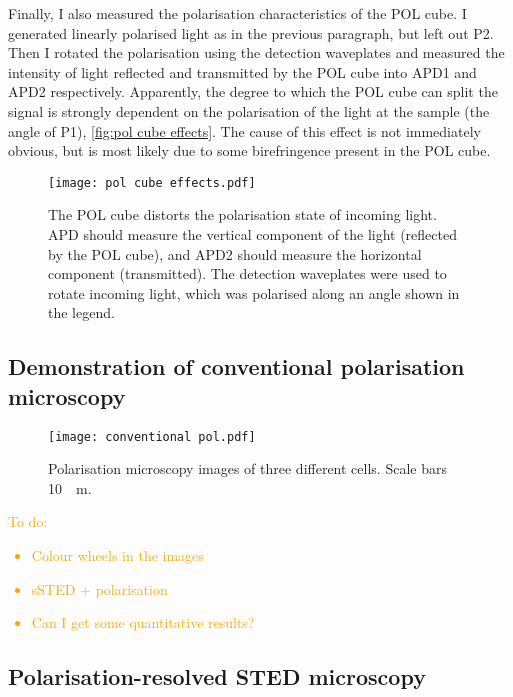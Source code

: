 Finally, I also measured the polarisation characteristics of the POL cube. I generated linearly polarised light as in the previous paragraph, but left out P2. Then I rotated the polarisation using the detection waveplates and measured the intensity of light reflected and transmitted by the POL cube into APD1 and APD2 respectively. Apparently, the degree to which the POL cube can split the signal is strongly dependent on the polarisation of the light at the sample (the angle of P1), \autoref{fig:pol cube effects}. The cause of this effect is not immediately obvious, but is most likely due to some birefringence present in the POL cube. 

\begin{figure}
	\centering
	\texttt{[image: pol cube effects.pdf]}
	\caption{The POL cube distorts the polarisation state of incoming light. APD should measure the vertical component of the light (reflected by the POL cube), and APD2 should measure the horizontal component (transmitted). The detection waveplates were used to rotate incoming light, which was polarised along an angle shown in the legend.}
	\label{fig:pol cube effects}
\end{figure}

\subsection{Demonstration of conventional polarisation microscopy}

\begin{figure}
	\centering
	\texttt{[image: conventional pol.pdf]}
	\caption{
		Polarisation microscopy images of three different cells. Scale bars \SI{10}{\mu m}.
	}
\end{figure}

\textcolor{orange}{
	To do:
	\begin{itemize}
		\item Colour wheels in the images
		\item sSTED + polarisation
		\item Can I get some quantitative results?
	\end{itemize}
} 

\subsection{Polarisation-resolved STED microscopy}

